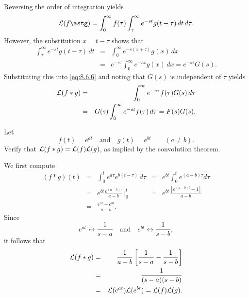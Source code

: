 \documentclass{ximera}
\begin{document}
Reversing the order of integration yields
\begin{equation}\label{eq:8.6.6}
{\cal L}(f\astg)=\int_0^\infty f(\tau)\int^\infty_\tau e^{-st}g(t-\tau)\,
dt
\,d\tau.
\end{equation}
However, the substitution $x=t-\tau$ shows that
\begin{eqnarray*}
\int^\infty_\tau e^{-st}g(t-\tau)\,dt&=&\int_0^\infty
e^{-s(x+\tau)}g(x)\,dx\\
&=&e^{-s\tau}\int_0^\infty e^{-sx}g(x)\,dx=e^{-s\tau}G(s).
\end{eqnarray*}
Substituting this into  \eqref{eq:8.6.6} and noting that $G(s)$ is
independent of $\tau$ yields
\begin{eqnarray*}
{\cal L}(f\ast g)&=&\int_0^\infty e^{-s\tau} f(\tau)G(s)\,d\tau\\
&=&G(s)\int_0^\infty e^{-st}f(\tau)\,d\tau=F(s)G(s).
\end{eqnarray*}


\begin{example}\label{example:8.6.1}
 Let
$$
f(t)=e^{at}\quad\mbox{and}\quad  g(t)=e^{bt}\qquad (a\ne b).
$$
Verify that ${\cal L}(f\ast g)={\cal L}(f){\cal L}(g)$, as
implied by the convolution theorem.
\begin{explanation}
We first compute
$$
\begin{array}{ccccc}
(f\ast g)(t)&=&\int_0^t e^{a\tau}e^{b(t-\tau)}\,d\tau
&=&e^{bt}\int_0^t e^{(a-b)\tau} d\tau\\
&=&e^{bt} \frac{e^{(a-b)\tau}}{ a-b}\,\bigg|^t_0&=&
e^{bt}\frac{\left[e^{(a-b)t}-1\right]}{a-b}\\
&=&\frac{e^{at}-e^{bt}}{a-b}.
\end{array}
$$
Since
$$
e^{at}\leftrightarrow \frac{1}{s-a}\quad\mbox{and}\quad
e^{bt}\leftrightarrow \frac{1}{s-b},
$$
it follows that
\begin{eqnarray*}
{\cal L}(f\ast g)&=&\frac{1}{a-b}\left[\frac{1}{s-a}-\frac{1}{s-b}\right]\\
&=&\frac{1}{(s-a)(s-b)}\\
&=&{\cal L}(e^{at}){\cal L}(e^{bt})={\cal L}(f){\cal L}(g).
\end{eqnarray*}
\end{explanation}
\end{example}
\end{document}
